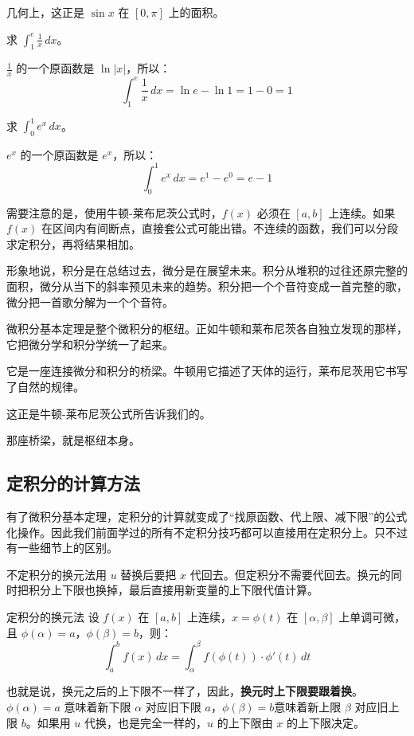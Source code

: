 几何上，这正是 $\sin x$ 在 $[0, \pi]$ 上的面积。

\begin{myexample}
  求 $\int_1^e \frac{1}{x}\, dx$。

  $\frac{1}{x}$ 的一个原函数是 $\ln|x|$，所以：
  \[
  \int_1^e \frac{1}{x}\, dx = \ln e - \ln 1 = 1 - 0 = 1
  \]
\end{myexample}

\begin{myexample}
  求 $\int_0^1 e^x\, dx$。

  $e^x$ 的一个原函数是 $e^x$，所以：
  \[
  \int_0^1 e^x\, dx = e^1 - e^0 = e - 1
  \]
\end{myexample}

需要注意的是，使用牛顿-莱布尼茨公式时，$f(x)$ 必须在 $[a, b]$ 上连续。如果 $f(x)$ 在区间内有间断点，直接套公式可能出错。不连续的函数，我们可以分段求定积分，再将结果相加。

形象地说，积分是在总结过去，微分是在展望未来。积分从堆积的过往还原完整的面积，微分从当下的斜率预见未来的趋势。积分把一个个音符变成一首完整的歌，微分把一首歌分解为一个个音符。

微积分基本定理是整个微积分的枢纽。正如牛顿和莱布尼茨各自独立发现的那样，它把微分学和积分学统一了起来。

它是一座连接微分和积分的桥梁。牛顿用它描述了天体的运行，莱布尼茨用它书写了自然的规律。

这正是牛顿-莱布尼茨公式所告诉我们的。

那座桥梁，就是枢纽本身。

\subsection{定积分的计算方法}

有了微积分基本定理，定积分的计算就变成了“找原函数、代上限、减下限”的公式化操作。因此我们前面学过的所有不定积分技巧都可以直接用在定积分上。只不过有一些细节上的区别。

不定积分的换元法用 $u$ 替换后要把 $x$ 代回去。但定积分不需要代回去。换元的同时把积分上下限也换掉，最后直接用新变量的上下限代值计算。

\begin{theorem}{定积分的换元法}{}
设 $f(x)$ 在 $[a, b]$ 上连续，$x = \phi(t)$ 在 $[\alpha, \beta]$ 上单调可微，且 $\phi(\alpha) = a$，$\phi(\beta) = b$，则：
\[
\int_a^b f(x)\, dx = \int_\alpha^\beta f(\phi(t)) \cdot \phi'(t)\, dt
\]
\end{theorem}

也就是说，换元之后的上下限不一样了，因此，\textbf{换元时上下限要跟着换}。$\phi(\alpha) = a$ 意味着新下限 $\alpha$ 对应旧下限 $a$，$\phi(\beta) = b$意味着新上限 $\beta$ 对应旧上限 $b$。如果用 $u$ 代换，也是完全一样的，$u$ 的上下限由 $x$ 的上下限决定。

